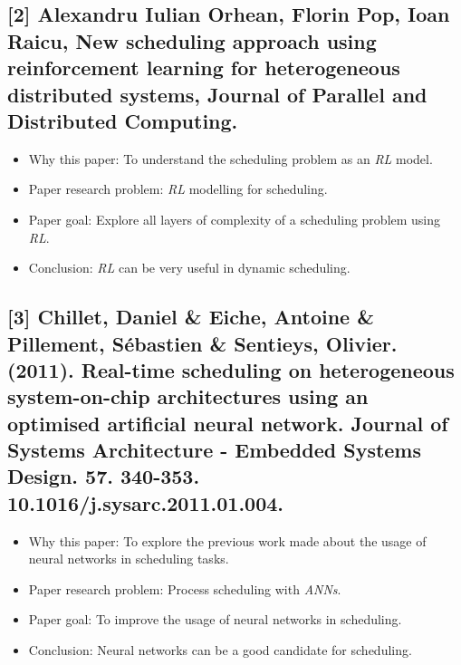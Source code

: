 \documentclass[twocolumn,11pt]{IEEEtran}
\begin{document}
     \subsection*{[2] Alexandru Iulian Orhean, Florin Pop, Ioan Raicu,
    New scheduling approach using reinforcement learning for heterogeneous distributed systems,
    Journal of Parallel and Distributed Computing.}
    \begin{itemize}
        \item Why this paper: To understand the scheduling problem as an \emph{RL} model.
        \item Paper research problem: \emph{RL} modelling for scheduling.
        \item Paper goal: Explore all layers of complexity of a scheduling problem using \emph{RL}.
        \item Conclusion: \emph{RL} can be very useful in dynamic scheduling.
    \end{itemize} 
    
    \subsection*{[3] Chillet, Daniel \& Eiche, Antoine \& Pillement, Sébastien \& Sentieys, Olivier. (2011). Real-time scheduling on heterogeneous system-on-chip architectures using an optimised artificial neural network. Journal of Systems Architecture - Embedded Systems Design. 57. 340-353. 10.1016/j.sysarc.2011.01.004.}
    \begin{itemize}
        \item Why this paper: To explore the previous work made about the usage of neural networks in scheduling tasks.
        \item Paper research problem: Process scheduling with \emph{ANNs}.
        \item Paper goal: To improve the usage of neural networks in scheduling.
        \item Conclusion: Neural networks can be a good candidate for scheduling.
    \end{itemize} 
\end{document}
